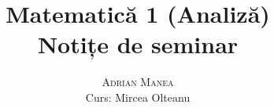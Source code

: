 \documentclass[12pt, a4paper]{book}
\begin{document}
\thispagestyle{empty}
\pagestyle{plain} %

\title{\huge\textbf{Matematică 1 (Analiză)} \\ \Large{Notițe de seminar}}
\vspace{1cm}
\author{\Large\textsc{Adrian Manea} \\ \large{Curs: Mircea Olteanu}}

\maketitle

\tableofcontents

\setcounter{page}{1} %














\renewcommand{\indexname}{Index}
\printindex



\nocite{*}
\end{document}
